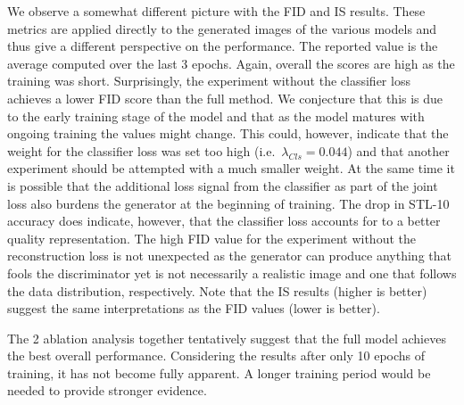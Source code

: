 \documentclass[a4paper,12pt]{report}
\begin{document}
We observe a somewhat different picture with the FID and IS results. These metrics are applied directly to the generated images of the various models and thus give a different perspective on the performance. The reported value is the average computed over the last 3 epochs. Again, overall the scores are high as the training was short. Surprisingly, the experiment without the classifier loss achieves a lower FID score than the full method. We conjecture that this is due to the early training stage of the model and that as the model matures with ongoing training the values might change. This could, however, indicate that the weight for the classifier loss was set too high (i.e.\ $\lambda_{Cls} = 0.044$) and that another experiment should be attempted with a much smaller weight. At the same time it is possible that the additional loss signal from the classifier as part of the joint loss also burdens the generator at the beginning of training. The drop in STL-10 accuracy does indicate, however, that the classifier loss accounts for to a better quality representation. The high FID value for the experiment without the reconstruction loss is not unexpected as the generator can produce anything that fools the discriminator yet is not necessarily a realistic image and one that follows the data distribution, respectively. Note that the IS results (higher is better) suggest the same interpretations as the FID values (lower is better).

The 2 ablation analysis together tentatively suggest that the full model achieves the best overall performance. Considering the results after only 10 epochs of training, it has not become fully apparent. A longer training period would be needed to provide stronger evidence.

% 
% 	
% 
\end{document}
